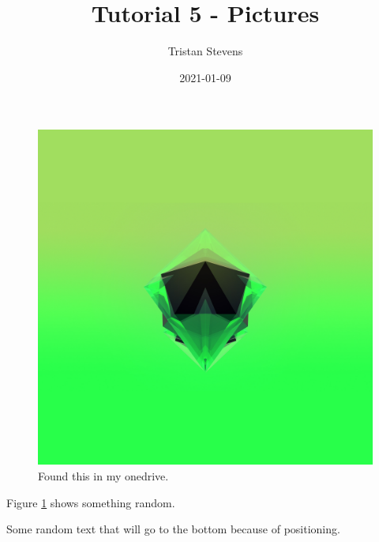 \documentclass{article}
\title{Tutorial 5 - Pictures}
\date{2021-01-09}
\author{Tristan Stevens}
\begin{document}
\maketitle
\newpage

\begin{figure}[b!]
\includegraphics[width=\linewidth]{test.jpg}
\caption{Found this in my onedrive.}
\label{fig:random1}
\end{figure}

Figure \ref{fig:random1} shows something random.

\newpage

Some random text that will go to the bottom because of positioning.
\end{document}
